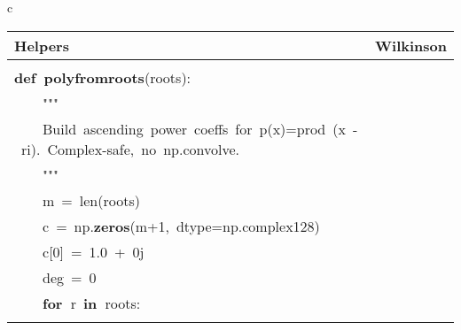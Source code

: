 \documentclass{article}\usepackage[]{graphicx}\usepackage[dvipsnames,table]{xcolor}
\makeatletter
\newcommand{\hlnum}[1]{\textcolor[rgb]{0.686,0.059,0.569}{#1}}%
\newcommand{\hlsng}[1]{\textcolor[rgb]{0.192,0.494,0.8}{#1}}%
\newcommand{\hlopt}[1]{\textcolor[rgb]{0,0,0}{#1}}%
\newcommand{\hldef}[1]{\textcolor[rgb]{0.345,0.345,0.345}{#1}}%
\newcommand{\hlkwa}[1]{\textcolor[rgb]{0.161,0.373,0.58}{\textbf{#1}}}%
\newcommand{\hlkwb}[1]{\textcolor[rgb]{0.69,0.353,0.396}{#1}}%
\newcommand{\hlkwd}[1]{\textcolor[rgb]{0.737,0.353,0.396}{\textbf{#1}}}%
\newenvironment{kframe}{%
 \def\at@end@of@kframe{}%
 \ifinner\ifhmode%
  \def\at@end@of@kframe{\end{minipage}}%
  \begin{minipage}{\columnwidth}%
 \fi\fi%
 \def\FrameCommand##1{\hskip\@totalleftmargin \hskip-\fboxsep
 \colorbox{shadecolor}{##1}\hskip-\fboxsep
     \hskip-\linewidth \hskip-\@totalleftmargin \hskip\columnwidth}%
 \MakeFramed {\advance\hsize-\width
   \@totalleftmargin\z@ \linewidth\hsize
   \@setminipage}}%
 {\par\unskip\endMakeFramed%
 \at@end@of@kframe}
\newenvironment{knitrout}{}{} %
\makeatother
\begin{document}
\begin{center}
\begin{tabular}{c}
\begin{tabular}{m{10cm}m{10cm}}
\toprule
Helpers & Wilkinson \\
\midrule
\begin{minipage}[m]{10cm}
\begin{knitrout}\tiny
\definecolor{shadecolor}{rgb}{0.969, 0.969, 0.969}\color{fgcolor}\begin{kframe}
\noindent
\ttfamily
\hldef{}\hlkwb{@njit}\hldef{}\hlopt{(}\hldef{fastmath}\hlopt{=}\hldef{}\hlkwa{True}\hldef{}\hlopt{)}\hspace*{\fill}\\
\hldef{}\hlkwa{def\ }\hldef{}\hlkwd{poly\textunderscore from\textunderscore roots}\hldef{}\hlopt{(}\hldef{roots}\hlopt{):}\hspace*{\fill}\\
\hldef{}\hldef{\ \ \ \ }\hldef{}\hlsng{"""}\hspace*{\fill}\\
\hlsng{}\hldef{\ \ \ \ }\hlsng{Build\ ascending\ power\ coeffs\ for\ p(x)=prod\ (x\ {-}\ r\textunderscore i).\ Complex{-}safe,\ no\ np.convolve.}\hspace*{\fill}\\
\hlsng{}\hldef{\ \ \ \ }\hlsng{"""}\hldef{}\hspace*{\fill}\\
\hldef{}\hldef{\ \ \ \ }\hldef{m\ }\hlopt{=\ }\hldef{}\hlkwb{len}\hldef{}\hlopt{(}\hldef{roots}\hlopt{)}\hspace*{\fill}\\
\hldef{}\hldef{\ \ \ \ }\hldef{c\ }\hlopt{=\ }\hldef{np}\hlopt{.}\hldef{}\hlkwd{zeros}\hldef{}\hlopt{(}\hldef{m}\hlopt{+}\hldef{}\hlnum{1}\hldef{}\hlopt{,\ }\hldef{dtype}\hlopt{=}\hldef{np}\hlopt{.}\hldef{complex128}\hlopt{)}\hspace*{\fill}\\
\hldef{}\hldef{\ \ \ \ }\hldef{c}\hlopt{{[}}\hldef{}\hlnum{0}\hldef{}\hlopt{{]}\ =\ }\hldef{}\hlnum{1.0\ }\hldef{}\hlopt{+\ }\hldef{}\hlnum{0}\hldef{j}\hspace*{\fill}\\
\hldef{}\hldef{\ \ \ \ }\hldef{deg\ }\hlopt{=\ }\hldef{}\hlnum{0}\hspace*{\fill}\\
\hldef{}\hldef{\ \ \ \ }\hldef{}\hlkwa{for\ }\hldef{r\ }\hlkwa{in\ }\hldef{roots}\hlopt{:}\hspace*{\fill}\\

\end{kframe}
\end{knitrout}
\end{minipage}
\end{tabular}
\end{tabular}
\end{center}
\end{document}
